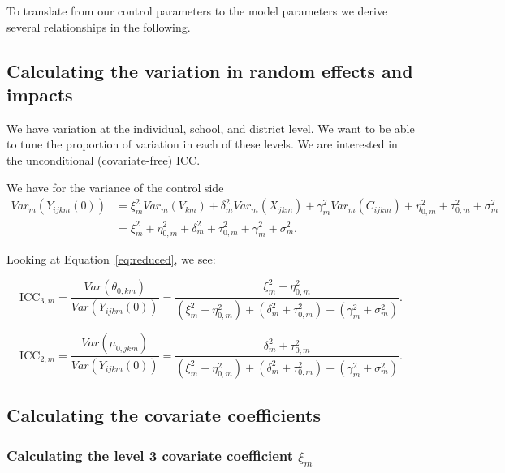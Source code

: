 \documentclass[12pt]{article}
\begin{document}
To translate from our control parameters to the model parameters we derive several relationships in the following.


\subsection{Calculating the variation in random effects and impacts}

We have variation at the individual, school, and district level.
We want to be able to tune the proportion of variation in each of these levels.
We are interested in the unconditional (covariate-free) ICC.

We have for the variance of the control side
\begin{align*}
Var_m( Y_{ijkm}(0) ) &= \xi_m^2 Var_m(V_{km}) + \delta_m^2 Var_m(X_{jkm}) + \gamma_m^2 Var_m(C_{ijkm}) + \eta^2_{0,m} + \tau^2_{0,m} + \sigma^2_m \\
&=  \xi_m^2 +  \eta^2_{0,m} + \delta_m^2  + \tau^2_{0,m} + \gamma_m^2 + \sigma^2_m.
\end{align*}

Looking at Equation~\ref{eq:reduced}, we see:

\[ \text{ICC}_{3,m} = \frac{Var(\theta_{0,km})}{ Var(Y_{ijkm}(0))} = \frac{\xi^2_m + \eta_{0,m}^2}{\left(\xi_m^2 +  \eta^2_{0,m}\right) + \left(\delta_m^2  + \tau^2_{0,m}\right) + \left(\gamma_m^2 + \sigma^2_m\right)}.\]

\[ \text{ICC}_{2,m} = \frac{Var(\mu_{0,jkm})}{ Var(Y_{ijkm}(0))} = \frac{\delta_m^2  + \tau_{0,m}^2}{\left(\xi_m^2 +  \eta^2_{0,m}\right) + \left(\delta_m^2  + \tau^2_{0,m}\right) + \left(\gamma_m^2 + \sigma^2_m\right)} .\]


\subsection{Calculating the covariate coefficients}

\subsubsection{Calculating the level 3 covariate coefficient $\xi_m$}
\end{document}
